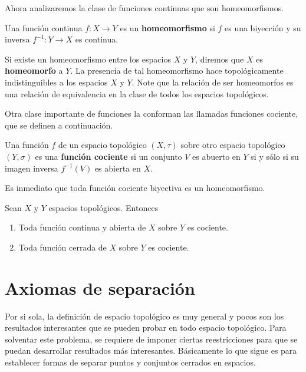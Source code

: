 \documentclass[12pt]{report}
\theoremstyle{largebreak}
\newcommand{\cf}[3]{\ensuremath{#1:#2\rightarrow#3}}
\begin{document}
    Ahora analizaremos la clase de funciones continuas que son homeomorfismos.
    
    \begin{mydef}
        Una función continua $\cf{f}{X}{Y}$ es un \textbf{homeomorfismo} si $f$ es una biyección y su inversa $\cf{f^{-1}}{Y}{X}$ es continua.
    \end{mydef}

    Si existe un homeomorfismo entre los espacios $X$ y $Y$, diremos que $X$ es \textbf{homeomorfo} a $Y$. La presencia de tal homeomorfismo hace topológicamente indistinguibles a los espacios $X$ y $Y$. Note que la relación de ser homeomorfos es una relación de equivalencia en la clase de todos los espacios topológicos.

    Otra clase importante de funciones la conforman las llamadas funciones cociente, que se definen a continuación.

    \begin{mydef}
        Una función $f$ de un espacio topológico $(X,\tau)$ sobre otro espacio topológico $(Y,\sigma)$ es una \textbf{función cociente} si un conjunto $V$ es abuerto en $Y$ si y sólo si su imagen inversa $f^{-1}(V)$ es abierta en $X$.
    \end{mydef}

    \begin{obs}
        Es inmediato que toda función cociente biyectiva es un homeomorfismo.
    \end{obs}

    \begin{propo}
        Sean $X$ y $Y$ espacios topológicos. Entonces
        \begin{enumerate}
            \item Toda función continua y abierta de $X$ sobre $Y$ es cociente.
            \item Toda función cerrada de $X$ sobre $Y$ es cociente.
        \end{enumerate}
    \end{propo}

    \section{Axiomas de separación}

    Por si sola, la definición de espacio topológico es muy general y pocos son los resultados interesantes que se pueden probar en todo espacio topológico. Para solventar este problema, se requiere de imponer ciertas reestricciones para que se puedan desarrollar resultados más interesantes. Básicamente lo que sigue es para establecer formas de separar puntos y conjuntos cerrados en espacios. 
\end{document}
